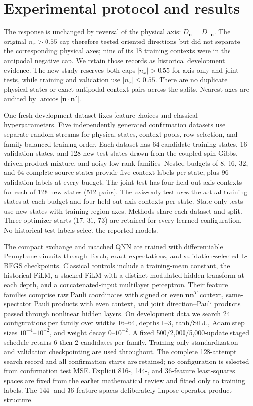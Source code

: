 \documentclass[pdflatex,sn-mathphys-num]{sn-jnl}
\begin{document}
\section{Experimental protocol and results}
The response is unchanged by reversal of the physical axis: $D_{\mathbf n}=D_{-\mathbf n}$. The original $n_x>0.55$ cap therefore tested oriented directions but did not separate the corresponding physical axes; nine of its 18 training contexts were in the antipodal negative cap. We retain those records as historical development evidence. The new study reserves both caps $|n_x|>0.55$ for axis-only and joint tests, while training and validation use $|n_x|\leq0.55$. There are no duplicate physical states or exact antipodal context pairs across the splits. Nearest axes are audited by $\arccos|\mathbf n\cdot\mathbf n'|$.

One fresh development dataset fixes feature choices and classical hyperparameters. Five independently generated confirmation datasets use separate random streams for physical states, context pools, row selection, and family-balanced training order. Each dataset has 64 candidate training states, 16 validation states, and 128 new test states drawn from the coupled-spin Gibbs, driven product-mixture, and noisy low-rank families. Nested budgets of 8, 16, 32, and 64 complete source states provide five context labels per state, plus 96 validation labels at every budget. The joint test has four held-out-axis contexts for each of 128 new states (512 pairs). The axis-only test uses the actual training states at each budget and four held-out-axis contexts per state. State-only tests use new states with training-region axes. Methods share each dataset and split. Three optimizer starts (17, 31, 73) are retained for every learned configuration. No historical test labels select the reported models.

The compact exchange and matched QNN are trained with differentiable PennyLane circuits through Torch, exact expectations, and validation-selected L-BFGS checkpoints. Classical controls include a training-mean constant, the historical FiLM, a stacked FiLM with a distinct modulated hidden transform at each depth, and a concatenated-input multilayer perceptron. Their feature families comprise raw Pauli coordinates with signed or even $\mathbf n\mathbf n^T$ context, same-spectator Pauli products with even context, and joint direction--Pauli products passed through nonlinear hidden layers. On development data we search 24 configurations per family over widths 16--64, depths 1--3, tanh/SiLU, Adam step sizes $10^{-4}$--$10^{-2}$, and weight decay $0$--$10^{-2}$. A fixed 500/2,000/5,000-update staged schedule retains 6 then 2 candidates per family. Training-only standardization and validation checkpointing are used throughout. The complete 128-attempt search record and all confirmation starts are retained; no configuration is selected from confirmation test MSE. Explicit 816-, 144-, and 36-feature least-squares spaces are fixed from the earlier mathematical review and fitted only to training labels. The 144- and 36-feature spaces deliberately impose operator-product structure.
\end{document}
